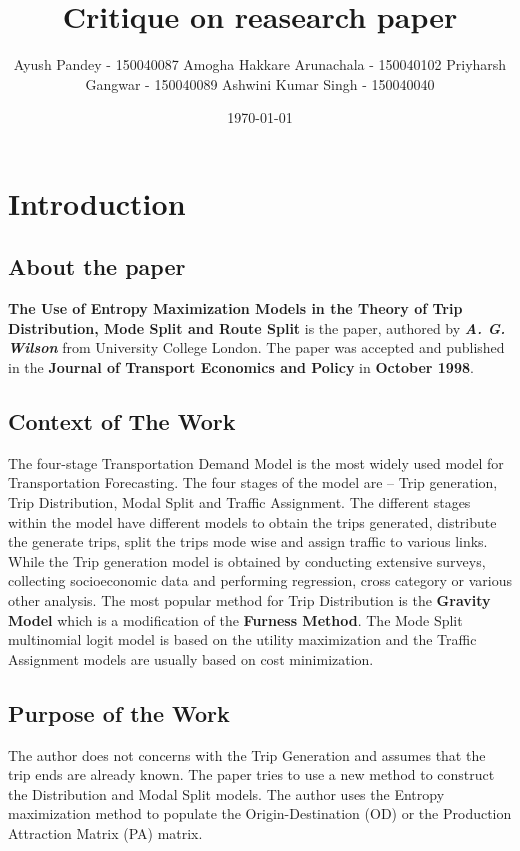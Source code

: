 \documentclass[12pt]{article}
\title{Critique on reasearch paper}
\author{\newline Ayush Pandey - 150040087 \newline Amogha Hakkare Arunachala - 150040102 \newline Priyharsh Gangwar - 150040089 \newline Ashwini Kumar Singh - 150040040 }
\date{\today}
\begin{document}
\maketitle

\color{black}

\section{Introduction}

\subsection{About the paper}

\noindent \color{black} \textbf{The Use of Entropy Maximization Models in the Theory of Trip Distribution, Mode Split and Route Split} is the paper, authored by \textbf{\emph{A. G. Wilson}} from University College London. The paper was accepted and published in the \textbf{Journal of Transport Economics and Policy} in \textbf{October 1998}.


\subsection{Context of The Work}
The four-stage Transportation Demand Model is the most widely used model for Transportation Forecasting. The four stages of the model are -- Trip generation, Trip Distribution, Modal Split and Traffic Assignment. The different stages within the model have different models to obtain the trips generated, distribute the generate trips, split the trips mode wise and assign traffic to various links. While the Trip generation model is obtained by conducting extensive surveys, collecting socioeconomic data and performing regression, cross category or various other analysis. The most popular method for Trip Distribution is the \textbf{Gravity Model} which is a modification of the \textbf{Furness Method}. The Mode Split multinomial logit model is based on the utility maximization and the Traffic Assignment models are usually based on cost minimization.

\subsection{Purpose of the Work}

The author does not concerns with the Trip Generation and assumes that the trip ends are already known. The paper tries to use a new method to construct the Distribution and Modal Split models. The author uses the Entropy maximization method to populate the Origin-Destination (OD) or the Production Attraction Matrix (PA) matrix.\\
\end{document}
